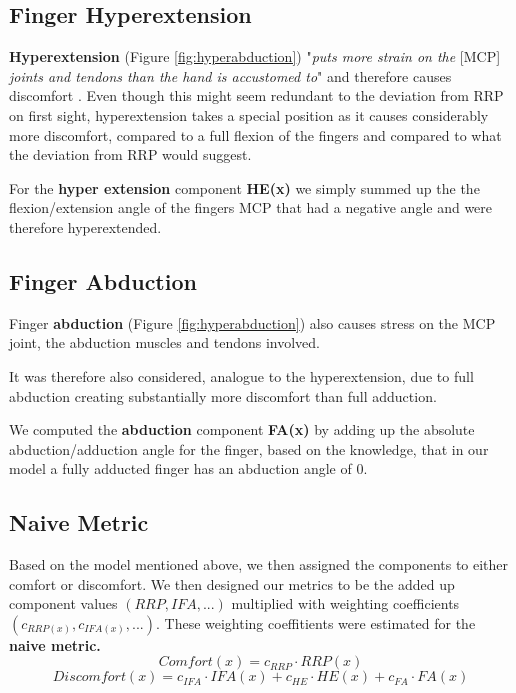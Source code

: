 \documentclass{sig-alternate-05-2015}
\begin{document}
\subsection{Finger Hyperextension}

\textbf{Hyperextension} (Figure \ref{fig:hyperabduction}) "\textit{puts more strain on the }[MCP] \textit{joints and tendons than the hand is accustomed to}" \cite{laviola1999survey} and therefore causes discomfort \cite{laviola1999survey}.
Even though this might seem redundant to the deviation from RRP on first sight, hyperextension takes a special position as it causes considerably more discomfort, compared to a full flexion of the fingers and compared to what the deviation from RRP would suggest.

For the \textbf{hyper extension} component \textbf{HE(x)} we simply summed up the the flexion/extension angle of the fingers MCP that had a negative angle and were therefore hyperextended.

\subsection{Finger Abduction}

Finger \textbf{abduction} (Figure \ref{fig:hyperabduction})
also causes stress on the MCP joint, the abduction muscles and tendons involved.

It was therefore also considered, analogue to the hyperextension, due to full abduction creating substantially more discomfort than full adduction.

We computed the \textbf{abduction} component \textbf{FA(x)} by adding up the absolute abduction/adduction angle for the finger, based on the knowledge, that in our model a fully adducted finger has an abduction angle of 0.


\subsection{Naive Metric}


Based on the model mentioned above\cite{vink2012editorial}, we then assigned the components to either comfort or discomfort. We then designed our metrics to be the added up component values \begin{math}(RRP, IFA, ...)\end{math} multiplied with weighting coefficients \begin{math}(c_{RRP(x)}, c_{IFA(x)}, ...)\end{math}. These weighting coeffitients were estimated for the \textbf{naive metric.} 
	\[
	Comfort(x) = c_{RRP}\cdot RRP(x)
	\]
	\[
	Discomfort(x) = c_{IFA}\cdot IFA(x)  +  c_{HE}\cdot HE(x)  +  c_{FA}\cdot FA(x)
	\]
\end{document}

